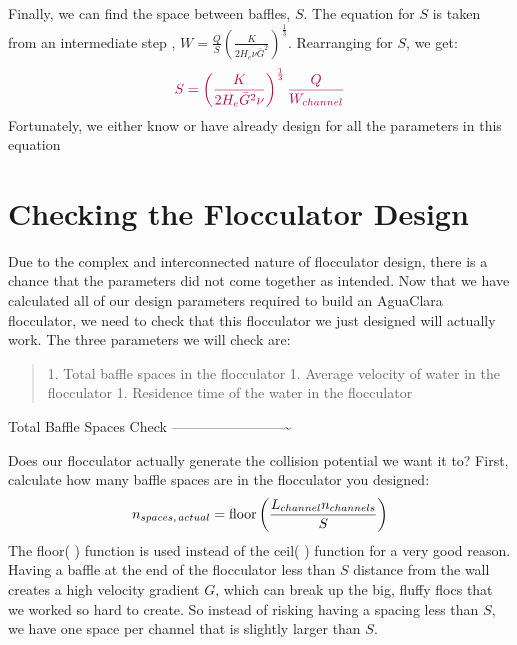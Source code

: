 \documentclass[letterpaper,10pt,english]{sphinxmanual}
\begin{document}
\subsubsection{}
\label{\detokenize{Flocculation/Floc_Design:baffle-spacing-math-s}}
Finally, we can find the space between baffles, \(S\). The equation for \(S\) is taken from an intermediate step , \(W = \frac{Q}{S}\left( \frac{K}{2 H_e \nu \bar G^2} \right)^\frac{1}{3}\). Rearranging for \(S\), we get:
\begin{equation}\label{equation:Flocculation/Floc_Design:Flocculation/Floc_Design:34}
\begin{split}\color{purple}{
S = \left( \frac{K}{2 H_e \bar G^2 \nu } \right)^\frac{1}{3} \frac{Q}{W_{channel}}
}\end{split}
\end{equation}
Fortunately, we either know or have already design for all the parameters in this equation


\section{Checking the Flocculator Design}
\label{\detokenize{Flocculation/Floc_Design:checking-the-flocculator-design}}
Due to the complex and interconnected nature of flocculator design, there is a chance that the parameters did not come together as intended. Now that we have calculated all of our design parameters required to build an AguaClara flocculator, we need to check that this flocculator we just designed will actually work. The three parameters we will check are:
\begin{quote}

1. Total baffle spaces in the flocculator
1. Average velocity of water in the flocculator
1. Residence time of the water in the flocculator
\end{quote}

Total Baffle Spaces Check
————————\textasciitilde{}

Does our flocculator actually generate the collision potential we want it to? First, calculate how many baffle spaces are in the flocculator you designed:
\begin{equation}\label{equation:Flocculation/Floc_Design:Flocculation/Floc_Design:35}
\begin{split}n_{spaces, \, actual} = {\rm floor}\left( \frac{L_{channel} n_{channels}}{S} \right)\end{split}
\end{equation}
 The floor( ) function is used instead of the ceil( ) function for a very good reason. Having a baffle at the end of the flocculator less than \(S\) distance from the wall creates a high velocity gradient \(G\), which can break up the big, fluffy flocs that we worked so hard to create. So instead of risking having a spacing less than \(S\), we have one space per channel that is slightly larger than \(S\).
\end{document}
